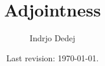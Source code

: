 



\title{Adjointness}
\author{Indrjo Dedej}
\date{Last revision: \today{}.}



\maketitle

\tableofcontents






